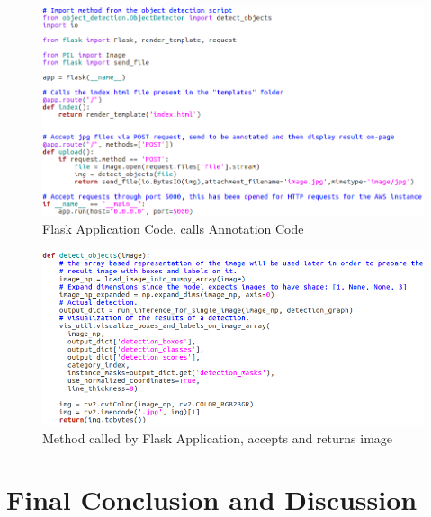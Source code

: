 \documentclass[12pt]{report}
\begin{document}
\vspace{0.5cm}
\begin{figure}[ht!]
	\centering
	\includegraphics[width=15cm]{flask}
	\caption{Flask Application Code, calls Annotation Code}
	\label{fig:flask}
\end{figure}

\vspace{0.5cm}
\begin{figure}[ht!]
	\centering
	\includegraphics[width=15cm]{flask-2}
	\caption{Method called by Flask Application, accepts and returns image}
	\label{fig:flask-2}
\end{figure}

\newpage
\chapter{Final Conclusion and Discussion}
\end{document}
